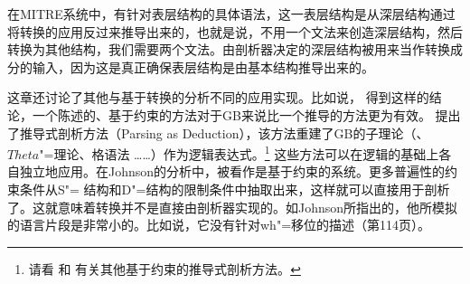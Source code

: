 在MITRE系统\citep{ZFHW65a}中，有针对表层结构的具体语法，这一表层结构是从深层结构通过将转换的应用反过来推导出来的，也就是说，不用一个文法来创造深层结构，然后转换为其他结构，我们需要两个文法。由剖析器决定的深层结构被用来当作转换成分的输入，因为这是真正确保表层结构是由基本结构推导出来的\citep[]{Kay2011a}。

这章还讨论了其他与基于转换的分析不同的应用实现。比如说， \citet[, \S~4]{KT91a}得到这样的结论，一个陈述的、基于约束的方法对于GB来说比一个推导的方法更为有效。 \citet{Johnson89a}提出了推导式剖析方法（Parsing as Deduction），该方法重建了GB的子理论（\xbartc、
$Theta$"=理论、格语法 \ldots\ldots）作为逻辑表达式。\footnote{%
请看 和 有关其他基于约束的推导式剖析方法。
}
这些方法可以在逻辑的基础上各自独立地应用。在Johnson的分析中，\gbtc 被看作是基于约束的系统。更多普遍性的约束条件从S"= 结构和D"=结构的限制条件中抽取出来，这样就可以直接用于剖析了。这就意味着转换并不是直接由剖析器实现的。如Johnson所指出的，他所模拟的语言片段是非常小的。比如说，它没有针对wh"=移位的描述（第114页）。


